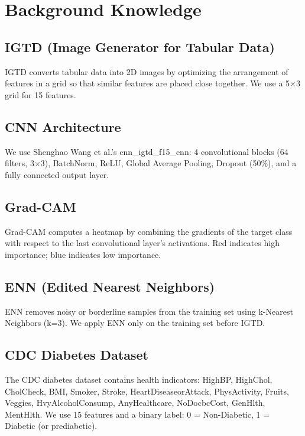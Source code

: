 \documentclass[12pt]{dalthesis}
\begin{document}
\chapter{Background Knowledge}\label{ch:background}

\section{IGTD (Image Generator for Tabular Data)}

IGTD converts tabular data into 2D images by optimizing the arrangement of features in a grid so that similar features are placed close together. We use a 5$\times$3 grid for 15 features.

\section{CNN Architecture}

We use Shenghao Wang et al.'s cnn\_igtd\_f15\_enn: 4 convolutional blocks (64 filters, 3$\times$3), BatchNorm, ReLU, Global Average Pooling, Dropout (50\%), and a fully connected output layer.

\section{Grad-CAM}

Grad-CAM computes a heatmap by combining the gradients of the target class with respect to the last convolutional layer's activations. Red indicates high importance; blue indicates low importance.

\section{ENN (Edited Nearest Neighbors)}

ENN removes noisy or borderline samples from the training set using k-Nearest Neighbors (k=3). We apply ENN only on the training set before IGTD.

\section{CDC Diabetes Dataset}

The CDC diabetes dataset contains health indicators: HighBP, HighChol, CholCheck, BMI, Smoker, Stroke, HeartDiseaseorAttack, PhysActivity, Fruits, Veggies, HvyAlcoholConsump, AnyHealthcare, NoDocbcCost, GenHlth, MentHlth. We use 15 features and a binary label: 0 = Non-Diabetic, 1 = Diabetic (or prediabetic).
\end{document}
